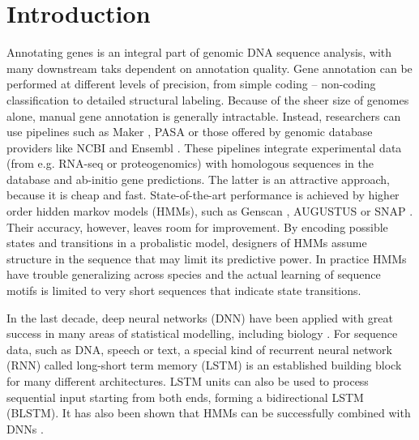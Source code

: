 \documentclass{bioinfo}
\begin{document}
\maketitle

\section{Introduction}
Annotating genes is an integral part of
genomic DNA sequence analysis, with many downstream taks
dependent on annotation quality.
Gene annotation can be performed at different levels 
of precision, from simple coding -- non-coding classification to detailed structural 
labeling. Because of the sheer size of genomes alone, manual gene annotation is 
generally intractable. Instead, researchers can use pipelines such as 
Maker \citep{cantarel2008maker}, PASA \citep{haas2003improving} or those 
offered by genomic database providers like NCBI 
\citep{thibaud2013eukaryotic} and Ensembl \citep{aken2016ensembl}. 
These pipelines integrate experimental data (from e.g. RNA-seq 
or proteogenomics) with homologous sequences in the database and ab-initio gene 
predictions. The latter is an attractive approach, because it is cheap and fast. 
State-of-the-art performance is achieved by higher order hidden markov models 
(HMMs), such as Genscan \citep{burge1997prediction}, AUGUSTUS \citep{stanke2003gene} 
or SNAP \citep{johnson2008snap}. Their accuracy, however, leaves room for 
improvement. By encoding possible states and transitions in a probalistic model, 
designers of HMMs assume structure in the sequence that may limit its predictive 
power. In practice HMMs have trouble generalizing across species and the actual learning 
of sequence motifs is limited to very short sequences that indicate state transitions.

In the last decade, deep neural networks (DNN) have been applied with great success 
in many areas of statistical modelling, including biology 
\citep{ching2018opportunities}. For sequence data, such as DNA, speech or text, a 
special kind of recurrent neural network (RNN) called long-short term memory (LSTM) 
\citep{hochreiter1997long} is an established building block for many different 
architectures. LSTM units can also be used to process sequential input starting 
from both ends, forming a bidirectional LSTM (BLSTM). It has also been shown that 
HMMs can be successfully combined with DNNs \citep{liu2016novo, liu2016pedla}.
\end{document}
